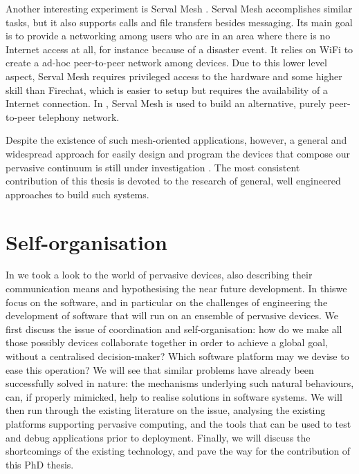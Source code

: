 \documentclass[12pt,a4paper,twoside,openright]{book}
\begin{document}
Another interesting experiment is Serval Mesh \cite{serval-mesh}.
%
Serval Mesh accomplishes similar tasks, but it also supports calls and file transfers besides messaging.
%
Its main goal is to provide a networking among users who are in an area where there is no Internet access at all, for instance because of a disaster event.
%
It relies on WiFi to create a ad-hoc peer-to-peer network among devices.
%
Due to this lower level aspect, Serval Mesh requires privileged access to the hardware and some higher skill than Firechat, which is easier to setup but requires the availability of a Internet connection.
%
In \cite{mesh-network-telephony}, Serval Mesh is used to build an alternative, purely peer-to-peer telephony network.

Despite the existence of such mesh-oriented applications, however, a general and widespread approach for easily design and program the devices that compose our pervasive continuum is still under investigation \cite{Ray13}.
%
The most consistent contribution of this thesis is devoted to the research of general, well engineered approaches to build such systems.

\chapter{Self-organisation}
\label{coordination-infrastructures}

In  we took a look to the world of pervasive devices, also describing their communication means and hypothesising the near future development.
%
In this\levelText{}we focus on the software, and in particular on the challenges of engineering the development of software that will run on an ensemble of pervasive devices.
%
We first discuss the issue of coordination and self-organisation: how do we make all those possibly devices collaborate together in order to achieve a global goal, without a centralised decision-maker?
%
Which software platform may we devise to ease this operation?
%
We will see that similar problems have already been successfully solved in nature: the mechanisms underlying such natural behaviours, can, if properly mimicked, help to realise solutions in software systems.
%
We will then run through the existing literature on the issue, analysing the existing platforms supporting pervasive computing, and the tools that can be used to test and debug applications prior to deployment.
%
Finally, we will discuss the shortcomings of the existing technology, and pave the way for the contribution of this PhD thesis.
\end{document}
